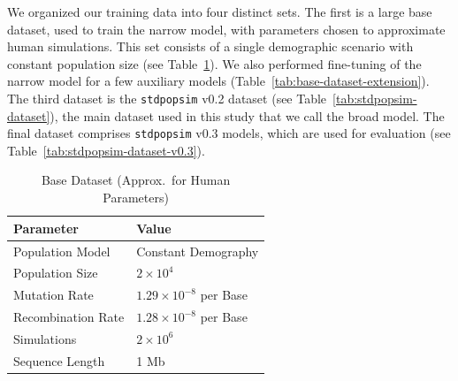 \documentclass[9pt,twoside]{pnas-new}
\newcommand{\stdpopsim}{\texttt{stdpopsim}\xspace}
\begin{document}
We organized our training data into four distinct sets. The first is a large base dataset,
used to train the narrow model, with parameters chosen to approximate human simulations.
This set consists of a single demographic scenario with constant population size
(see Table~\ref{tab:base-dataset}). 
We also performed fine-tuning of the narrow model for a
few auxiliary models (Table~\ref{tab:base-dataset-extension}).
The third dataset is the \stdpopsim v0.2 dataset (see Table~\ref{tab:stdpopsim-dataset}), 
the main dataset used in this study that we call the broad model. 
The final dataset comprises \stdpopsim v0.3 models, which are used for evaluation (see Table~\ref{tab:stdpopsim-dataset-v0.3}).


\begin{table}[b]
    \centering
    \caption{Base Dataset (Approx.\ for Human Parameters)}
    \label{tab:base-dataset}
    \begin{tabular}{ll}
        \toprule
        \textbf{Parameter} & \textbf{Value} \\
        \midrule
        Population Model           & Constant Demography \\
        Population Size            & $2 \times 10^4$ \\
        Mutation Rate              & $1.29 \times 10^{-8}$ per Base \\
        Recombination Rate         & $1.28 \times 10^{-8}$  per Base\\
        Simulations      & $2 \times 10^6$ \\
        Sequence Length            & 1 Mb \\
        \bottomrule
    \end{tabular}
\end{table}
\end{document}
